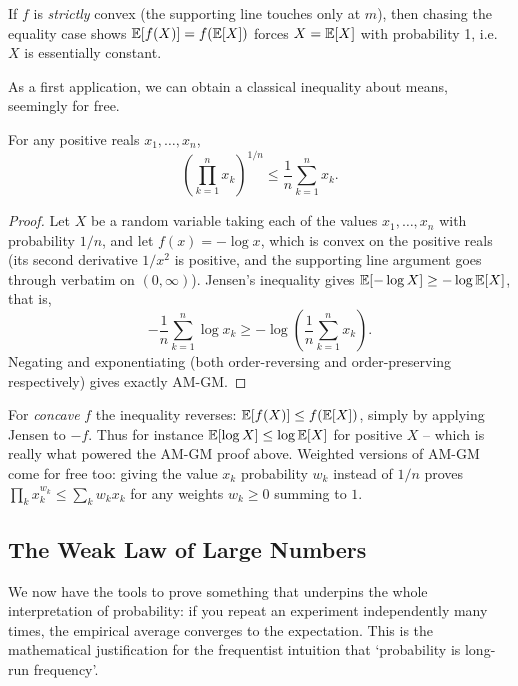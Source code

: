 \documentclass[a4paper]{scrartcl}
\begin{document}
\begin{remark}
	If $f$ is \emph{strictly} convex (the supporting line touches only at $m$), then chasing the equality case shows $\mathbb{E}[f(X)] = f(\mathbb{E}[X])$ forces $X = \mathbb{E}[X]$ with probability 1, i.e.\ $X$ is essentially constant.
\end{remark}

As a first application, we can obtain a classical inequality about means, seemingly for free.

\begin{corollary}[AM-GM Inequality]
	For any positive reals $x_1, \dots, x_n$,
	$$
	\left(\prod_{k = 1}^{n} x_k\right)^{1/n} \leq \frac{1}{n}\sum_{k = 1}^{n} x_k.
	$$
\end{corollary}
\begin{proof}
	Let $X$ be a random variable taking each of the values $x_1, \dots, x_n$ with probability $1/n$, and let $f(x) = -\log x$, which is convex on the positive reals (its second derivative $1/x^2$ is positive, and the supporting line argument goes through verbatim on $(0,\infty)$). Jensen's inequality gives $\mathbb{E}[-\log X] \geq -\log \mathbb{E}[X]$, that is,
	$$
	-\frac{1}{n}\sum_{k=1}^n \log x_k \geq -\log\left(\frac{1}{n}\sum_{k=1}^n x_k\right).
	$$
	Negating and exponentiating (both order-reversing and order-preserving respectively) gives exactly AM-GM.
\end{proof}

\begin{remark}
	For \emph{concave} $f$ the inequality reverses: $\mathbb{E}[f(X)] \leq f(\mathbb{E}[X])$, simply by applying Jensen to $-f$. Thus for instance $\mathbb{E}[\log X] \leq \log \mathbb{E}[X]$ for positive $X$ -- which is really what powered the AM-GM proof above. Weighted versions of AM-GM come for free too: giving the value $x_k$ probability $w_k$ instead of $1/n$ proves $\prod_k x_k^{w_k} \leq \sum_k w_k x_k$ for any weights $w_k \geq 0$ summing to $1$.
\end{remark}

\subsection{The Weak Law of Large Numbers}

We now have the tools to prove something that underpins the whole interpretation of probability: if you repeat an experiment independently many times, the empirical average converges to the expectation. This is the mathematical justification for the frequentist intuition that `probability is long-run frequency'.
\end{document}
